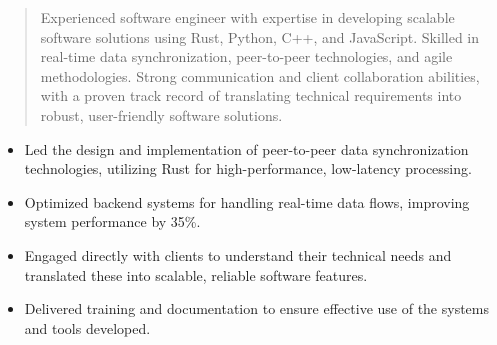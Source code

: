 



\makecvheader

\begin{quote}
  \noindent
  Experienced software engineer with expertise in developing scalable software solutions using Rust, Python, C++, and JavaScript. Skilled in real-time data synchronization, peer-to-peer technologies, and agile methodologies. Strong communication and client collaboration abilities, with a proven track record of translating technical requirements into robust, user-friendly software solutions.
\end{quote}

\par\smallskip
\noindent
\begin{minipage}{20cm}
  \begin{minipage}{9.75cm}
    \begin{itemize}
      \item Led the design and implementation of peer-to-peer data synchronization technologies, utilizing Rust for high-performance, low-latency processing.
      \item Optimized backend systems for handling real-time data flows, improving system performance by 35\%.
    \end{itemize}
  \end{minipage}
  \hfill
  \begin{minipage}{9.75cm}
    \begin{itemize}
      \item Engaged directly with clients to understand their technical needs and translated these into scalable, reliable software features.
      \item Delivered training and documentation to ensure effective use of the systems and tools developed.
    \end{itemize}
  \end{minipage}
\end{minipage}
\par

\divider

